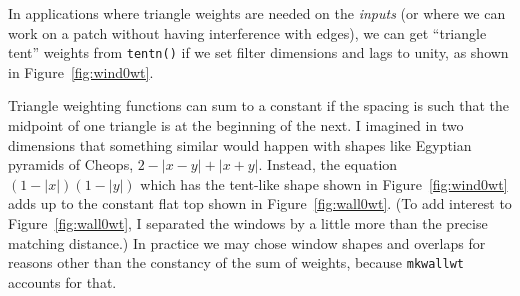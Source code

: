 \par
In applications where triangle weights are needed on the {\it inputs}
(or where we can work on a patch
without having interference with edges),
we can get ``triangle tent'' weights
from {\tt tentn()} if we set filter dimensions and lags to unity,
as shown in Figure~\ref{fig:wind0wt}.
\par
    Triangle weighting functions
can sum to a constant
if the spacing is such that the midpoint of one triangle
is at the beginning of the next.
I imagined in two dimensions that something similar would happen
with shapes like Egyptian pyramids of Cheops, $2-|x-y|+|x+y|$.
Instead,
the equation $(1-|x|)(1-|y|)$
which has the tent-like shape shown
in Figure~\ref{fig:wind0wt}
adds up to the constant flat top shown in Figure~\ref{fig:wall0wt}.
(To add interest to Figure~\ref{fig:wall0wt},
I separated the windows by a little more than the precise matching distance.)
In practice we may chose window shapes and overlaps for
reasons other than the constancy of the sum of weights,
because \texttt{mkwallwt}  accounts for that.



%


